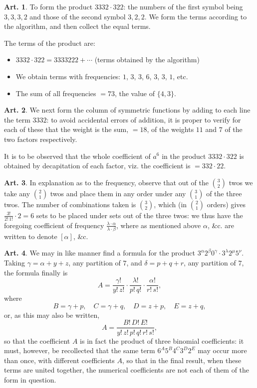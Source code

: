 \documentclass[11pt,a4paper]{article}
\theoremstyle{definition}
\newtheorem{art}{Art.}[section]
\begin{document}
\begin{art}
To form the product $3332 \cdot 322$: the numbers of the first symbol being $3,3,3,2$ and those of the second symbol $3,2,2$. We form the terms according to the algorithm, and then collect the equal terms.

The terms of the product are:
\begin{itemize}[leftmargin=2em]
\item $3332 \cdot 322 = 3333222 + \cdots$ (terms obtained by the algorithm)
\item We obtain terms with frequencies: $1$, $3$, $3$, $6$, $3$, $3$, $1$, etc.
\item The sum of all frequencies $= 73$, the value of $\{4,3\}$.
\end{itemize}
\end{art}

\begin{art}
We next form the column of symmetric functions by adding to each line the term $3332$: to avoid accidental errors of addition, it is proper to verify for each of these that the weight is the sum, $=18$, of the weights $11$ and $7$ of the two factors respectively.

It is to be observed that the whole coefficient of $a^6$ in the product $3332 \cdot 322$ is obtained by decapitation of each factor, viz. the coefficient is $= 332 \cdot 22$.
\end{art}

\begin{art}
In explanation as to the frequency, observe that out of the $\binom{3}{2}$ twos we take any $\binom{2}{1}$ twos and place them in any order under any $\binom{3}{1}$ of the three twos. The number of combinations taken is $\binom{3}{2}$, which (in $\binom{2}{1}$ orders) gives $\frac{3!}{2!\,1!} \cdot 2 = 6$ sets to be placed under sets out of the three twos: we thus have the foregoing coefficient of frequency $\frac{\lambda \cdot \alpha}{\lambda \cdot \beta}$, where as mentioned above $\alpha$, \&c. are written to denote $[\alpha]$, \&c.
\end{art}

\begin{art}
We may in like manner find a formula for the product $3^\alpha 2^\beta 0^\gamma \cdot 3^\lambda 2^\mu 5^\nu$. Taking $\gamma = \alpha + y + z$, any partition of $7$, and $\delta = p + q + r$, any partition of $7$, the formula finally is
\[
A = \frac{\gamma!}{y!\,z!} \cdot \frac{\lambda!}{p!\,q!} \cdot \frac{\alpha!}{r!\,s!},
\]
where
\[
B = \gamma + p, \quad C = \gamma + q, \quad D = z + p, \quad E = z + q,
\]
or, as this may also be written,
\[
A = \frac{B!\,D!\,E!}{y!\,z!\,p!\,q!\,r!\,s!},
\]
so that the coefficient $A$ is in fact the product of three binomial coefficients: it must, however, be recollected that the same term $6^A 5^B 4^C 3^D 2^E$ may occur more than once, with different coefficients $A$, so that in the final result, when these terms are united together, the numerical coefficients are not each of them of the form in question.
\end{art}
\end{document}
